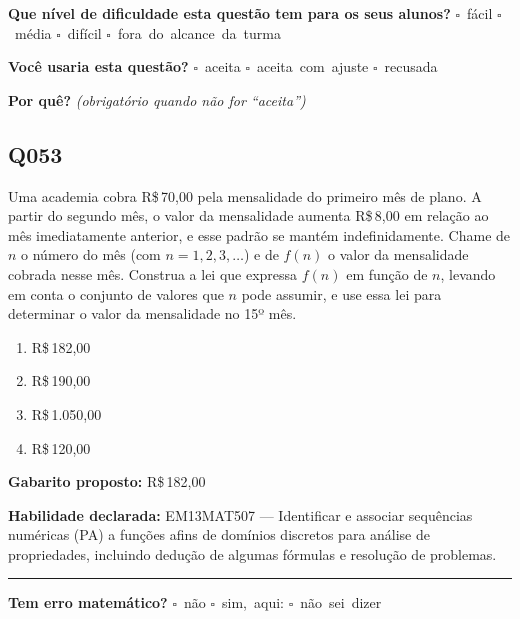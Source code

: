 \documentclass[11pt,a4paper]{article}
\begin{document}
\textbf{Que nível de dificuldade esta questão tem para os seus alunos?}\quad
\mbox{$\square$~fácil} \quad \mbox{$\square$~média} \quad
\mbox{$\square$~difícil} \quad \mbox{$\square$~fora do alcance da turma}

\textbf{Você usaria esta questão?}\quad
\mbox{$\square$~aceita} \quad \mbox{$\square$~aceita com ajuste} \quad
\mbox{$\square$~recusada}

\textbf{Por quê?} \emph{(obrigatório quando não for ``aceita'')}

\underline{\hspace{\linewidth}}

\underline{\hspace{\linewidth}}
\vspace{0.6em}

\begin{samepage}
\subsection*{Q053}
Uma academia cobra R\$\,70,00 pela mensalidade do primeiro mês de plano. A partir do segundo mês, o valor da mensalidade aumenta R\$\,8,00 em relação ao mês imediatamente anterior, e esse padrão se mantém indefinidamente. Chame de $n$ o número do mês (com $n = 1, 2, 3, \dots$) e de $f(n)$ o valor da mensalidade cobrada nesse mês. Construa a lei que expressa $f(n)$ em função de $n$, levando em conta o conjunto de valores que $n$ pode assumir, e use essa lei para determinar o valor da mensalidade no 15º mês.
\begin{enumerate}[label=(\alph*),nosep,leftmargin=*]
\item R\$\,182,00
\item R\$\,190,00
\item R\$\,1.050,00
\item R\$\,120,00
\end{enumerate}

\textbf{Gabarito proposto:} R\$\,182,00

\textbf{Habilidade declarada:} EM13MAT507 --- Identificar e associar sequências numéricas (PA) a funções afins de domínios discretos para análise de propriedades, incluindo dedução de algumas fórmulas e resolução de problemas.
\end{samepage}

\noindent\rule{\linewidth}{0.4pt}
\textbf{Tem erro matemático?}\quad
\mbox{$\square$~não} \quad \mbox{$\square$~sim, aqui:} \underline{\hspace{5cm}}
\quad \mbox{$\square$~não sei dizer}
\end{document}
